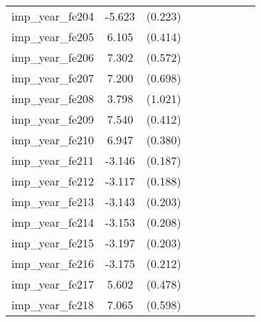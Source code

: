 {\begin{tabular}{l*{4}{cc}}
imp\_year\_fe204&   -5.623\sym{***}&  (0.223)&                  &         &                  &         &                  &         \\
imp\_year\_fe205&    6.105\sym{***}&  (0.414)&                  &         &                  &         &                  &         \\
imp\_year\_fe206&    7.302\sym{***}&  (0.572)&                  &         &                  &         &                  &         \\
imp\_year\_fe207&    7.200\sym{***}&  (0.698)&                  &         &                  &         &                  &         \\
imp\_year\_fe208&    3.798\sym{***}&  (1.021)&                  &         &                  &         &                  &         \\
imp\_year\_fe209&    7.540\sym{***}&  (0.412)&                  &         &                  &         &                  &         \\
imp\_year\_fe210&    6.947\sym{***}&  (0.380)&                  &         &                  &         &                  &         \\
imp\_year\_fe211&   -3.146\sym{***}&  (0.187)&                  &         &                  &         &                  &         \\
imp\_year\_fe212&   -3.117\sym{***}&  (0.188)&                  &         &                  &         &                  &         \\
imp\_year\_fe213&   -3.143\sym{***}&  (0.203)&                  &         &                  &         &                  &         \\
imp\_year\_fe214&   -3.153\sym{***}&  (0.208)&                  &         &                  &         &                  &         \\
imp\_year\_fe215&   -3.197\sym{***}&  (0.203)&                  &         &                  &         &                  &         \\
imp\_year\_fe216&   -3.175\sym{***}&  (0.212)&                  &         &                  &         &                  &         \\
imp\_year\_fe217&    5.602\sym{***}&  (0.478)&                  &         &                  &         &                  &         \\
imp\_year\_fe218&    7.065\sym{***}&  (0.598)&                  &         &                  &         &                  &         \\

\end{tabular}}
